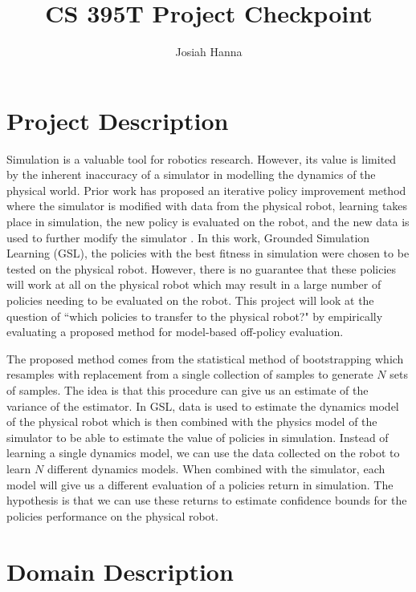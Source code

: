 \documentclass[11 pt]{article}
\author{Josiah Hanna}
\title{CS 395T Project Checkpoint}
\begin{document}

\section{Project Description}

Simulation is a valuable tool for robotics research. However, its value is limited by the inherent inaccuracy of a simulator in modelling the dynamics of the physical world. Prior work has proposed an iterative policy improvement method where the simulator is modified with data from the physical robot, learning takes place in simulation, the new policy is evaluated on the robot, and the new data is used to further modify the simulator \cite{farchy2013humanoid}. In this work, Grounded Simulation Learning (GSL), the policies with the best fitness in simulation were chosen to be tested on the physical robot. However, there is no guarantee that these policies will work at all on the physical robot which may result in a large number of policies needing to be evaluated on the robot. This project will look at the question of ``which policies to transfer to the physical robot?" by empirically evaluating a proposed method for model-based off-policy evaluation.

The proposed method comes from the statistical method of bootstrapping which resamples with replacement from a single collection of samples to generate $N$ sets of samples. The idea is that this procedure can give us an estimate of the variance of the estimator. In GSL, data is used to estimate the dynamics model of the physical robot which is then combined with the physics model of the simulator to be able to estimate the value of policies in simulation. Instead of learning a single dynamics model, we can use the data collected on the robot to learn $N$ different dynamics models. When combined with the simulator, each model will give us a different evaluation of a policies return in simulation. The hypothesis is that we can use these returns to estimate confidence bounds for the policies performance on the physical robot.


\section{Domain Description}
\end{document}

